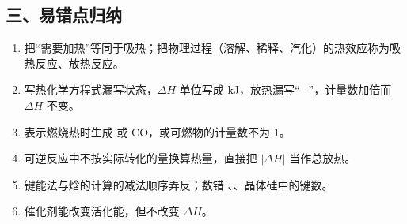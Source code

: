 \documentclass[UTF8,a4paper,zihao=5,oneside,openany,fontset=none]{ctexbook}
\begin{document}
\subsection*{三、易错点归纳}
\begin{enumerate}
\item 把“需要加热”等同于吸热；把物理过程（溶解、稀释、汽化）的热效应称为吸热反应、放热反应。
\item 写热化学方程式漏写状态，$\Delta H$ 单位写成 kJ，放热漏写“$-$”，计量数加倍而 $\Delta H$ 不变。
\item 表示燃烧热时生成  或 CO，或可燃物的计量数不为 1。
\item 可逆反应中不按实际转化的量换算热量，直接把 $|\Delta H|$ 当作总放热。
\item 键能法与焓的计算的减法顺序弄反；数错 、、晶体硅中的键数。
\item 催化剂能改变活化能，但不改变 $\Delta H$。
\end{enumerate}
\end{document}
